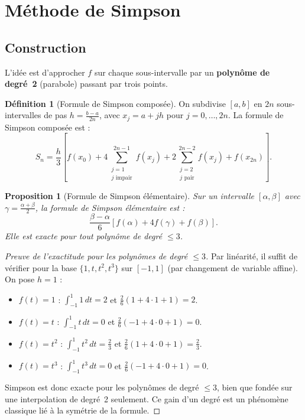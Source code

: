 \documentclass[a4paper,12pt]{article}
\theoremstyle{definition}
\newtheorem{definition}{Définition}[section]
\theoremstyle{plain}
\newtheorem{proposition}{Proposition}[section]
\theoremstyle{remark}
\begin{document}
\section{Méthode de Simpson}

\subsection{Construction}

L'idée est d'approcher $f$ sur chaque sous-intervalle par un \textbf{polynôme de degré~2} (parabole) passant par trois points.

\begin{definition}[Formule de Simpson composée]
On subdivise $[a,b]$ en $2n$ sous-intervalles de pas $h = \frac{b-a}{2n}$, avec $x_j = a + jh$ pour $j = 0, \ldots, 2n$. La formule de Simpson composée est :
\[
  S_n = \frac{h}{3}\left[f(x_0) + 4\sum_{\substack{j=1 \\ j\text{ impair}}}^{2n-1} f(x_j) + 2\sum_{\substack{j=2 \\ j\text{ pair}}}^{2n-2} f(x_j) + f(x_{2n})\right].
\]
\end{definition}

\begin{proposition}[Formule de Simpson élémentaire]
Sur un intervalle $[\alpha, \beta]$ avec $\gamma = \frac{\alpha+\beta}{2}$, la formule de Simpson élémentaire est :
\[
  \frac{\beta - \alpha}{6}\left[f(\alpha) + 4f(\gamma) + f(\beta)\right].
\]
Elle est exacte pour tout polynôme de degré $\leq 3$.
\end{proposition}

\begin{proof}[Preuve de l'exactitude pour les polynômes de degré $\leq 3$]
Par linéarité, il suffit de vérifier pour la base $\{1, t, t^2, t^3\}$ sur $[-1, 1]$ (par changement de variable affine). On pose $h = 1$ :
\begin{itemize}
  \item $f(t) = 1$ : $\int_{-1}^1 1\,dt = 2$ et $\frac{2}{6}(1 + 4\cdot 1 + 1) = 2$. \checkmark
  \item $f(t) = t$ : $\int_{-1}^1 t\,dt = 0$ et $\frac{2}{6}(-1 + 4\cdot 0 + 1) = 0$. \checkmark
  \item $f(t) = t^2$ : $\int_{-1}^1 t^2\,dt = \frac{2}{3}$ et $\frac{2}{6}(1 + 4\cdot 0 + 1) = \frac{2}{3}$. \checkmark
  \item $f(t) = t^3$ : $\int_{-1}^1 t^3\,dt = 0$ et $\frac{2}{6}(-1 + 4\cdot 0 + 1) = 0$. \checkmark
\end{itemize}
Simpson est donc exacte pour les polynômes de degré $\leq 3$, bien que fondée sur une interpolation de degré~2 seulement. Ce \og gain d'un degré\fg{} est un phénomène classique lié à la symétrie de la formule.
\end{proof}
\end{document}
